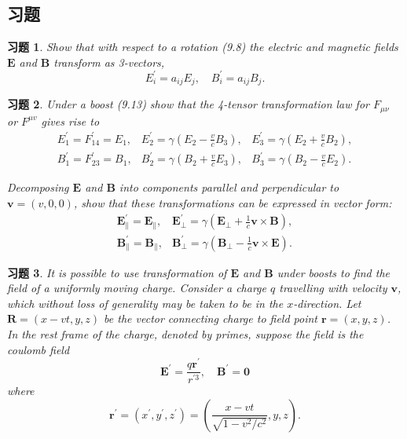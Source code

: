 \documentclass[hyperref,UTF8]{ctexbook}
\newtheorem{problem}{习题}[chapter]
\begin{document}
\subsection*{习题}
\begin{problem}  Show that with respect to a rotation (9.8) the electric and magnetic fields $\mathbf{E}$ and $\mathbf{B}$ transform as 3-vectors,
$$
E_i^{\prime}=a_{i j} E_j, \quad B_i^{\prime}=a_{i j} B_j .
$$
\end{problem}
\begin{problem}
    

Under a boost (9.13) show that the 4-tensor transformation law for $F_{\mu \nu}$ or $F^{\mu v}$ gives rise to
$$
\begin{array}{lll}
E_1^{\prime}=F_{14}^{\prime}=E_1, & E_2^{\prime}=\gamma\left(E_2-\frac{v}{c} B_3\right), & E_3^{\prime}=\gamma\left(E_2+\frac{v}{c} B_2\right), \\
B_1^{\prime}=F_{23}^{\prime}=B_1, & B_2^{\prime}=\gamma\left(B_2+\frac{v}{c} E_3\right), & B_3^{\prime}=\gamma\left(B_2-\frac{v}{c} E_2\right) .
\end{array}
$$

Decomposing $\mathbf{E}$ and $\mathbf{B}$ into components parallel and perpendicular to $\mathbf{v}=(v, 0,0)$, show that these transformations can be expressed in vector form:
$$
\begin{array}{ll}
\mathbf{E}_{\|}^{\prime}=\mathbf{E}_{\|}, & \mathbf{E}_{\perp}^{\prime}=\gamma\left(\mathbf{E}_{\perp}+\frac{1}{c} \mathbf{v} \times \mathbf{B}\right), \\
\mathbf{B}_{\|}^{\prime}=\mathbf{B}_{\|}, & \mathbf{B}_{\perp}^{\prime}=\gamma\left(\mathbf{B}_{\perp}-\frac{1}{c} \mathbf{v} \times \mathbf{E}\right) .
\end{array}
$$
\end{problem}
\begin{problem} It is possible to use transformation of $\mathbf{E}$ and $\mathbf{B}$ under boosts to find the field of a uniformly moving charge. Consider a charge $q$ travelling with velocity $\mathbf{v}$, which without loss of generality may be taken to be in the $x$-direction. Let $\mathbf{R}=(x-v t, y, z)$ be the vector connecting charge to field point $\mathbf{r}=(x, y, z)$. In the rest frame of the charge, denoted by primes, suppose the field is the coulomb field
$$
\mathbf{E}^{\prime}=\frac{q \mathbf{r}^{\prime}}{r^{\prime 3}}, \quad \mathbf{B}^{\prime}=\mathbf{0}
$$
where
$$
\mathbf{r}^{\prime}=\left(x^{\prime}, y^{\prime}, z^{\prime}\right)=\left(\frac{x-v t}{\sqrt{1-v^2 / c^2}}, y, z\right) .
$$
\end{problem}
\end{document}
